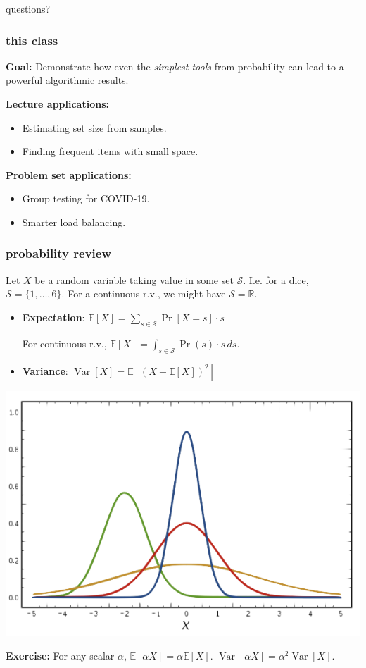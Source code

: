 \documentclass[]{beamer}
\newcommand{\R}{\mathbb{R}}
\newcommand{\E}{\mathbb{E}}
\DeclareMathOperator{\Var}{Var}
\begin{document}
	\begin{frame}[standout]
		\begin{center}
			questions?
		\end{center}
	\end{frame}
	
	\begin{frame}
		\frametitle{this class}
		\textbf{Goal:} Demonstrate how even the \emph{simplest tools} from probability can lead to a powerful algorithmic results. 
		
		\textbf{Lecture applications:}
		\begin{itemize}
			\item Estimating set size from samples. 
			\item Finding frequent items with small space.
		\end{itemize}
		\textbf{Problem set applications:}
		\begin{itemize}
			\item Group testing for COVID-19.
			\item Smarter load balancing. 
		\end{itemize}	
	\end{frame}
	
	\begin{frame}
		\frametitle{probability review}
		Let ${X}$ be a random variable taking value in some set $\mathcal{S}$. I.e. for a dice, $\mathcal{S} = \{1,\ldots, 6\}$. For a continuous r.v., we might have $\mathcal{S} = \R$.
		
		\begin{itemize}
			\item \textbf{Expectation}: \hspace{1em}$\E[X] = \sum_{s\in \mathcal{S}} \Pr[{X} = s]\cdot s$
			
			\vspace{.5em}
			For continuous r.v., $\E[X] = \int_{s\in \mathcal{S}} \Pr(s)\cdot s \,ds$.
			
			\vspace{1em}
			\item \textbf{Variance}: \hspace{1.2em} $\Var[X] = \E[(X - \E[X])^2]$
		\end{itemize}
		\begin{center}
			\includegraphics[width=.45\textwidth]{rvs.png}
			
			\textbf{Exercise:} For any scalar $\alpha$,  $\E[\alpha X] = \alpha \E[X]$. $\Var[\alpha X] = \alpha^2 \Var[X]$.
		\end{center} 
	\end{frame}
	
\end{document}
